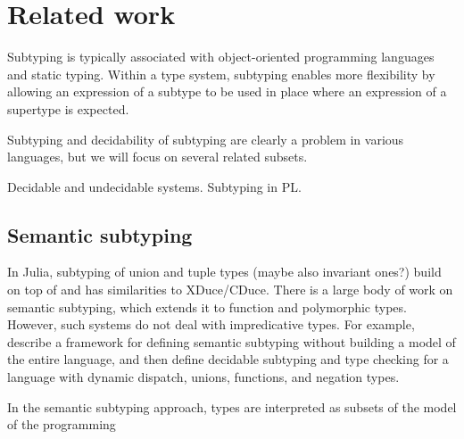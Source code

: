 \chapter{Related work}\label{chap:5}


Subtyping is typically associated with object-oriented programming languages and
static typing. Within a type system, subtyping enables more flexibility by
allowing an expression of a subtype to be used in place where an expression of a
supertype is expected.


Subtyping and decidability of subtyping are clearly a problem in various languages,
but we will focus on several related subsets.

Decidable and undecidable systems. Subtyping in PL.

\section{Semantic subtyping}

In Julia, subtyping of union and tuple types (maybe also invariant ones?) build
on top of  and has similarities to XDuce/CDuce.
There is a large body of work on semantic subtyping, which extends it to
function and polymorphic types. However, such systems do not deal with
impredicative types.
For example, \citet{frih:sem-sub:2008} describe a framework for defining semantic
subtyping without building a model of the entire language, and then define
decidable subtyping and type checking for a language with dynamic dispatch,
unions, functions, and negation types.

In the semantic subtyping approach, types are interpreted as subsets of the
model of the programming

